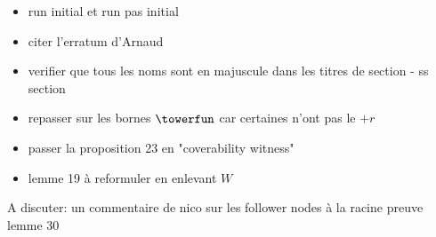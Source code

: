 \begin{itemize}
    \item run initial et run pas initial 
    \item citer l'erratum d'Arnaud
    \item verifier que tous les noms sont en majuscule dans les titres de section - ss section
    \item repasser sur les bornes $\towerfun$ car certaines n'ont pas le $+r$
    \item passer la proposition 23 en "coverability witness"
    \item lemme 19 à reformuler en enlevant $W$
\end{itemize}

A discuter: un commentaire de nico sur les follower nodes à la racine
preuve lemme 30
